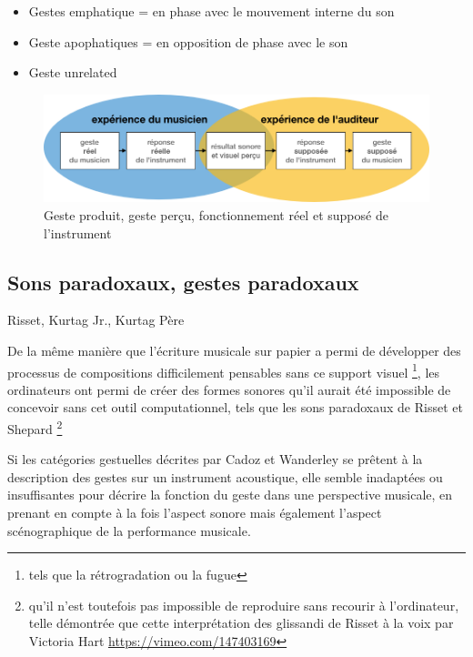 \vspace{-1em}
\begin{itemize}[noitemsep]
\item Gestes emphatique = en phase avec le mouvement interne du son
\item Geste apophatiques = en opposition de phase avec le son
\item Geste unrelated
\end{itemize}

\begin{figure}[!htbp]
	\includegraphics[width=\textwidth]{gfx/03_gesture/gesteReelGesteSuppose.jpg}
	\caption{Geste produit, geste perçu, fonctionnement réel et supposé de l'instrument}
	\label{fig:gesture:RealVsSupposed}
\end{figure}


\subsection{Sons paradoxaux, gestes paradoxaux}
Risset, Kurtag Jr., Kurtag Père

De la même manière que l'écriture musicale sur papier a permi de développer des processus de compositions difficilement pensables sans ce support visuel \footnote{tels que la rétrogradation ou la fugue}, les ordinateurs ont permi de créer des formes sonores qu'il aurait été impossible de concevoir sans cet outil computationnel, tels que les sons paradoxaux de Risset et Shepard \footnote{qu'il n'est toutefois pas impossible de reproduire sans recourir à l'ordinateur, telle démontrée que cette interprétation des glissandi de Risset à la voix par Victoria Hart \url{https://vimeo.com/147403169}}

Si les catégories gestuelles décrites par Cadoz et Wanderley se prêtent à la description des gestes sur un instrument acoustique, elle semble inadaptées ou insuffisantes pour décrire la fonction du geste dans une perspective musicale, en prenant en compte à la fois l'aspect sonore mais également l'aspect scénographique de la performance musicale.

